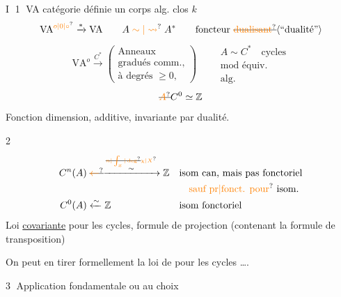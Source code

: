 \textcircled{I} \textcircled{1} VA catégorie  définie   un corps alg. clos $k$
\[
 \mathrm{VA}^{\unsure{o|0|\circ}}\xrightarrow{*}\mathrm{VA}\qquad
 A\mathrel{\unsure{\sim|\leadsto}}A^* \qquad\text{foncteur \deleted{\unsure{dualisant}}\inserted{``dualité''}}
\]
\[
 \mathrm{VA}^{o}\xrightarrow{C^*}
 \left(\begin{gathered}\text{Anneaux}\\ \text{gradués comm.,}\\
 \text{à degrés }\geqslant 0,\end{gathered}\right)
 \qquad \begin{gathered} A\sim C^*\quad\text{cycles}\\\text{mod équiv.}\\\text{alg.}\end{gathered}
\]
\[
 \deleted{\unsure{A}}C^0\simeq\mathbb Z
\]
Fonction dimension, additive, invariante par dualité.

\textcircled{2}
\[
\begin{aligned}
 C^n(A)&\mathrel{\deleted{\unsure{\leftarrow}}}
 \xrightarrow{\overset{\deleted{\unsure{n|\int_x|\deg}}\unsure{\chi|X}}{\sim}}\mathbb Z
 &&\text{isom can, mais pas fonctoriel}\\
 &&&\quad\text{\unsure{sauf pr|fonct. pour} isom.}\\
 C^0(A)&\xleftarrow{\sim}\mathbb Z &&\text{isom fonctoriel}
\end{aligned}
\]
Loi \uline{covariante} pour les cycles, formule de projection (contenant la formule de transposition)

On peut en tirer formellement la loi de  pour les cycles \ldots.

\textcircled{3} Application fondamentale
ou au choix

